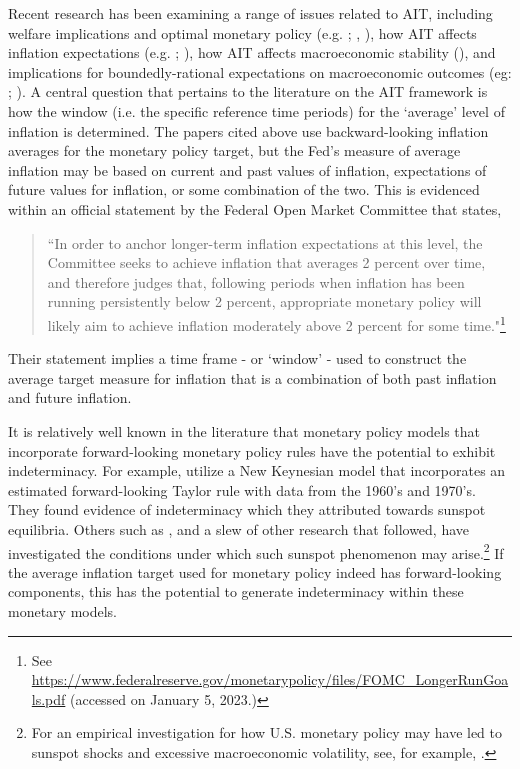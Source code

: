 \documentclass[english,authoryear,12pt]{elsarticle}
\begin{document}
Recent research has been examining a range of issues related to AIT, including welfare implications and optimal monetary policy (e.g. \citealp{budianto2020}; \citealp{eo2020}, \citealp{nessen2005}), how AIT affects inflation expectations (e.g. \citealp{coibion2020}; \citealp{hoffmann2022}), how AIT affects macroeconomic stability (\citealp{piergallini2022}), and implications for boundedly-rational expectations on macroeconomic outcomes (eg: \citealp{honka2021}; \citealp{budianto2020}). A central question that pertains to the literature on the AIT framework is how the window (i.e. the specific reference time periods) for the `average' level of inflation is determined. The papers cited above use backward-looking inflation averages for the monetary policy target, but the Fed's measure of average inflation may be based on current and past values of inflation, expectations of future values for inflation, or some combination of the two. This is evidenced within an official statement by the Federal Open Market Committee that states,

\vspace*{-1pc}\begin{quote}
	``In order to anchor longer-term inflation expectations at this level, the Committee seeks to achieve inflation that averages 2 percent over time, and therefore judges that, following periods when inflation has been running persistently below 2 percent, appropriate monetary policy will likely aim to achieve inflation moderately above 2 percent for some time."\footnote{See \url{https://www.federalreserve.gov/monetarypolicy/files/FOMC_LongerRunGoals.pdf} (accessed on January 5, 2023.)}
\end{quote}

\vspace*{-1pc} Their statement implies a time frame - or `window' - used to construct the average target measure for inflation that is a combination of both past inflation and future inflation.

It is relatively well known in the literature that monetary policy models that incorporate forward-looking monetary policy rules have the potential to exhibit indeterminacy. For example, \cite{clarida2000monetary} utilize a New Keynesian model that incorporates an estimated forward-looking Taylor rule with data from the 1960's and 1970's. They found evidence of indeterminacy which they attributed towards sunspot equilibria. Others such as \cite{evans2005monetary}, and a slew of other research that followed, have investigated the conditions under which such sunspot phenomenon may arise.\footnote{For an empirical investigation for how U.S. monetary policy may have led to sunspot shocks and excessive macroeconomic volatility, see, for example, \cite{lubik2004}.} If the average inflation target used for monetary policy indeed has forward-looking components, this has the potential to generate indeterminacy within these monetary models.
\end{document}
